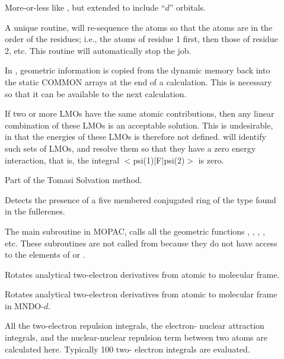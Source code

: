 \begin{description}
\item[] More-or-less like , but extended to include 
``$d$'' orbitals.

\item[] A unique routine,  will re-sequence the atoms
so that the atoms are in the order of the residues; i.e., the atoms of residue
1 first, then those of residue 2, etc.  This routine will automatically stop
the job.

\item[] In , geometric information is  copied
from the dynamic memory back into the static COMMON arrays at the end of a
calculation. This is necessary so that it can be available to the next
calculation.

\item[] If two or more LMOs have the same atomic contributions,
then any linear combination of these LMOs is an acceptable solution. This is
undesirable, in that the energies of these LMOs is therefore not defined. 
 will identify such sets of LMOs, and resolve them so that they
have a zero energy interaction, that is, the integral $<\!$psi(1)|F|psi(2)$\!>$
is zero.

\item[] Part of the Tomasi Solvation method.

\item[] Detects the presence of a five membered conjugated ring of
the type found in the fullerenes.

\item[] The main subroutine in MOPAC,  calls all the
geometric functions , , ,  , etc. 
These subroutines are not called from  because they do not have
access to the elements of  or .

\item[] Rotates analytical two-electron derivatives from atomic to
molecular frame.

\item[] Rotates analytical two-electron derivatives from atomic to
molecular frame in MNDO-$d$.

\item[] All the two-electron repulsion integrals, the electron-
nuclear attraction integrals, and the nuclear-nuclear repulsion term between
two atoms are calculated here. Typically 100 two- electron integrals are
evaluated.


\end{description}
